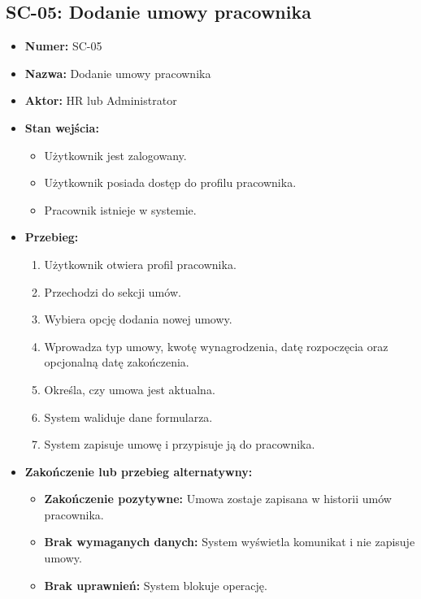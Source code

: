 \subsection{SC-05: Dodanie umowy pracownika}
\begin{itemize}
    \item \textbf{Numer:} SC-05
    \item \textbf{Nazwa:} Dodanie umowy pracownika
    \item \textbf{Aktor:} HR lub Administrator
    \item \textbf{Stan wejścia:}
    \begin{itemize}
        \item Użytkownik jest zalogowany.
        \item Użytkownik posiada dostęp do profilu pracownika.
        \item Pracownik istnieje w systemie.
    \end{itemize}
    \item \textbf{Przebieg:}
    \begin{enumerate}
        \item Użytkownik otwiera profil pracownika.
        \item Przechodzi do sekcji umów.
        \item Wybiera opcję dodania nowej umowy.
        \item Wprowadza typ umowy, kwotę wynagrodzenia, datę rozpoczęcia oraz opcjonalną datę zakończenia.
        \item Określa, czy umowa jest aktualna.
        \item System waliduje dane formularza.
        \item System zapisuje umowę i przypisuje ją do pracownika.
    \end{enumerate}
    \item \textbf{Zakończenie lub przebieg alternatywny:}
    \begin{itemize}
        \item \textbf{Zakończenie pozytywne:} Umowa zostaje zapisana w historii umów pracownika.
        \item \textbf{Brak wymaganych danych:} System wyświetla komunikat i nie zapisuje umowy.
        \item \textbf{Brak uprawnień:} System blokuje operację.
    \end{itemize}
\end{itemize}

